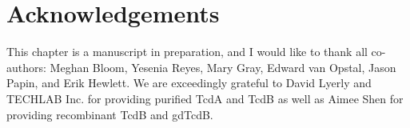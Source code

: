 \section{Acknowledgements}
This chapter is a manuscript in preparation, and I would
like to thank all co-authors: Meghan Bloom, Yesenia Reyes,
Mary Gray, Edward van Opstal, Jason Papin, and Erik Hewlett.
We are exceedingly grateful to David Lyerly and 
TECHLAB Inc. for providing purified TcdA and TcdB 
as well as Aimee Shen for providing recombinant TcdB 
and gdTcdB.




